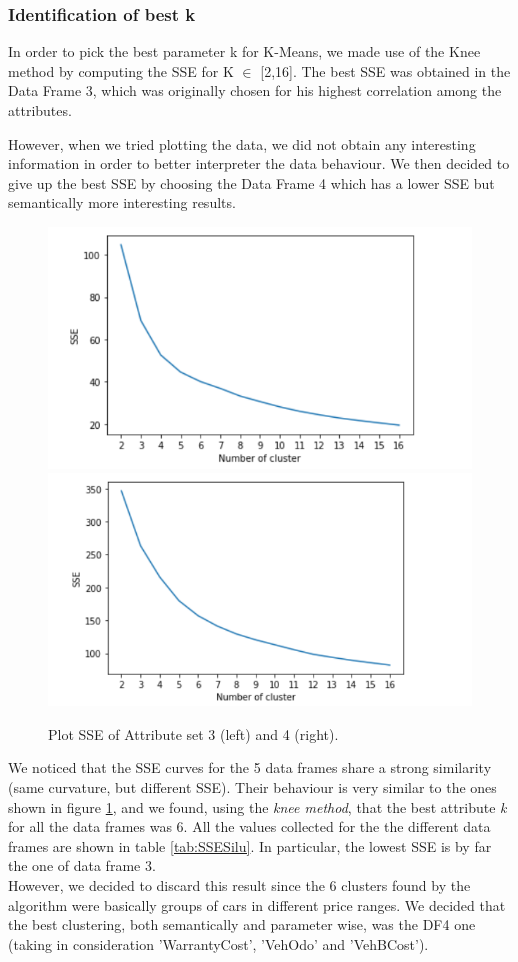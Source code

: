 \documentclass{article}
\begin{document}
	
	\subsubsection{Identification of best k}
	
	
	In order to pick the best parameter k for K-Means, we made use of the Knee method by computing the SSE for K $\in$ [2,16]. The best SSE was obtained in the Data Frame 3, which was originally chosen for his highest correlation among the attributes.
	
	However, when we tried plotting the data, we did not obtain any interesting information in order to better interpreter the data behaviour. We then decided to give up the best SSE by choosing the Data Frame 4 which has a lower SSE but semantically more interesting results.
	
	
	\begin{figure}[H]
		\centering
		\includegraphics[width=.49\textwidth]{cattura}\hfill
		\includegraphics[width=.49\textwidth]{SSE2}\hfill
		\caption{Plot SSE of Attribute set 3 (left) and 4 (right).}
		\label{fig:KmeansSSE}
	\end{figure}
	We noticed that the SSE curves for the 5 data frames share a strong similarity (same curvature, but different SSE). Their behaviour is very similar to the ones shown in figure \ref{fig:KmeansSSE}, and we found, using the \emph{knee method}, that the best attribute \emph{k} for all the data frames was 6. All the values collected for the the different data frames are shown in table \ref{tab:SSESilu}. In particular, the lowest SSE is by far the one of data frame 3. \\However, we decided to discard this result since the 6 clusters found by the algorithm were basically groups of cars in different price ranges. We decided that the best clustering, both semantically and parameter wise, was the DF4 one (taking in consideration 'WarrantyCost', 'VehOdo' and 'VehBCost').
	
\end{document}
